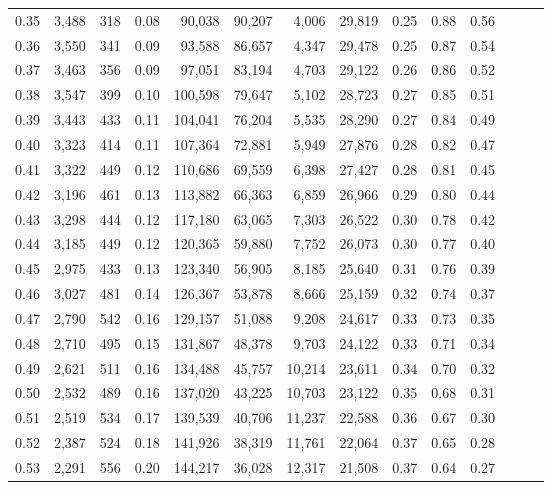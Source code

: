\begin{tabular}{rrrrrrrrrrrrrr}
0.35 &  3,488 &  318 &  0.08 &   90,038 &   90,207 &   4,006 &  29,819 &  0.25 &  0.88 &      0.56 \\
0.36 &  3,550 &  341 &  0.09 &   93,588 &   86,657 &   4,347 &  29,478 &  0.25 &  0.87 &      0.54 \\
0.37 &  3,463 &  356 &  0.09 &   97,051 &   83,194 &   4,703 &  29,122 &  0.26 &  0.86 &      0.52 \\
0.38 &  3,547 &  399 &  0.10 &  100,598 &   79,647 &   5,102 &  28,723 &  0.27 &  0.85 &      0.51 \\
0.39 &  3,443 &  433 &  0.11 &  104,041 &   76,204 &   5,535 &  28,290 &  0.27 &  0.84 &      0.49 \\
0.40 &  3,323 &  414 &  0.11 &  107,364 &   72,881 &   5,949 &  27,876 &  0.28 &  0.82 &      0.47 \\
0.41 &  3,322 &  449 &  0.12 &  110,686 &   69,559 &   6,398 &  27,427 &  0.28 &  0.81 &      0.45 \\
0.42 &  3,196 &  461 &  0.13 &  113,882 &   66,363 &   6,859 &  26,966 &  0.29 &  0.80 &      0.44 \\
0.43 &  3,298 &  444 &  0.12 &  117,180 &   63,065 &   7,303 &  26,522 &  0.30 &  0.78 &      0.42 \\
0.44 &  3,185 &  449 &  0.12 &  120,365 &   59,880 &   7,752 &  26,073 &  0.30 &  0.77 &      0.40 \\
0.45 &  2,975 &  433 &  0.13 &  123,340 &   56,905 &   8,185 &  25,640 &  0.31 &  0.76 &      0.39 \\
0.46 &  3,027 &  481 &  0.14 &  126,367 &   53,878 &   8,666 &  25,159 &  0.32 &  0.74 &      0.37 \\
0.47 &  2,790 &  542 &  0.16 &  129,157 &   51,088 &   9,208 &  24,617 &  0.33 &  0.73 &      0.35 \\
0.48 &  2,710 &  495 &  0.15 &  131,867 &   48,378 &   9,703 &  24,122 &  0.33 &  0.71 &      0.34 \\
0.49 &  2,621 &  511 &  0.16 &  134,488 &   45,757 &  10,214 &  23,611 &  0.34 &  0.70 &      0.32 \\
0.50 &  2,532 &  489 &  0.16 &  137,020 &   43,225 &  10,703 &  23,122 &  0.35 &  0.68 &      0.31 \\
0.51 &  2,519 &  534 &  0.17 &  139,539 &   40,706 &  11,237 &  22,588 &  0.36 &  0.67 &      0.30 \\
0.52 &  2,387 &  524 &  0.18 &  141,926 &   38,319 &  11,761 &  22,064 &  0.37 &  0.65 &      0.28 \\
0.53 &  2,291 &  556 &  0.20 &  144,217 &   36,028 &  12,317 &  21,508 &  0.37 &  0.64 &      0.27 \\

\end{tabular}

